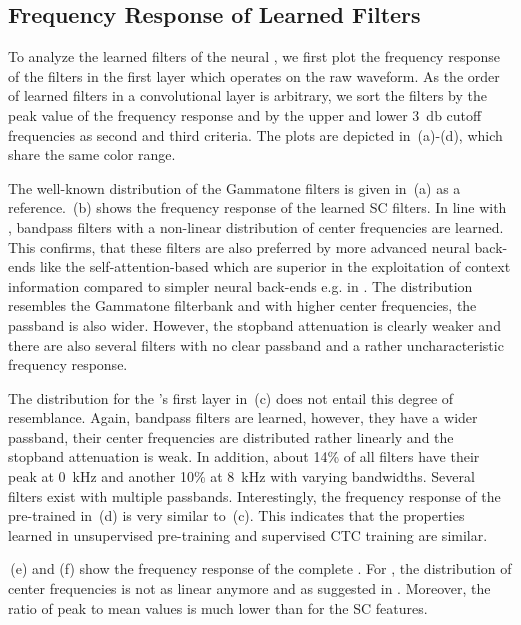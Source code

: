\documentclass{INTERSPEECH2023}
\begin{document}
\vspace{-0.5cm}
\subsection{Frequency Response of Learned Filters}
\label{sec:freq_resp}
To analyze the learned filters of the neural \fes, we first plot the frequency response of the filters in the first layer which operates on the raw waveform.
As the order of learned filters in a convolutional layer is arbitrary, we sort the filters by the peak value of the frequency response and by the upper and lower \SI{3}{\decibel} cutoff frequencies as second and third criteria.
The plots are depicted in \,(a)-(d), which share the same color range.

The well-known distribution of the Gammatone filters is given in \,(a) as a reference.
\,(b) shows the frequency response of the learned \gls{SC} filters.
In line with \cite{tuske2018:waveform}, bandpass filters with a non-linear distribution of center frequencies are learned.
This confirms, that these filters are also preferred by more advanced neural back-ends like the self-attention-based \conformer which are superior in the exploitation of context information compared to simpler neural back-ends e.g. in \cite{tuske2014raw}.
The distribution resembles the Gammatone filterbank and with higher center frequencies, the passband is also wider.
However, the stopband attenuation is clearly weaker and there are also several filters with no clear passband and a rather uncharacteristic frequency response.

The distribution for the \wvtwo \fe's first layer in \,(c) does not entail this degree of resemblance.
Again, bandpass filters are learned, however, they have a wider passband, their center frequencies are distributed rather linearly and the stopband attenuation is weak.
In addition, about 14\% of all filters have their peak at \SI{0}{\kilo\hertz} and another 10\% at \SI{8}{\kilo\hertz} with varying bandwidths.
Several filters exist with multiple passbands.
Interestingly, the frequency response of the pre-trained \wvtwo \fe in \,(d) is very similar to \,(c).
This indicates that the properties learned in unsupervised pre-training and supervised \gls{CTC} training are similar.

\,(e) and (f) show the frequency response of the complete \fe.
For \wvtwo, the distribution of center frequencies is not as linear anymore and as suggested in \cite{choi2022w2v2fe}.
Moreover, the ratio of peak to mean values is much lower than for the \gls{SC} features.
\end{document}
